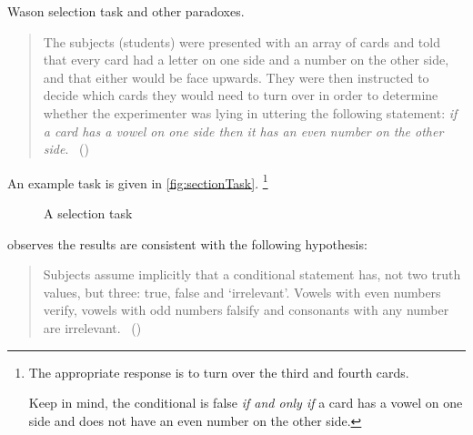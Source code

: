 \begin{note}
  Wason selection task and other paradoxes.

  \begin{quote}
    The subjects (students) were presented with an array of cards and told that every card had a letter on one side and a number on the other side, and that either would be face upwards.
    They were then instructed to decide which cards they would need to turn over in order to determine whether the experimenter was lying in uttering the following statement:
    \emph{if a card has a vowel on one side then it has an even number on the other side}.%
    \mbox{ }\hfill\mbox{(\citeyear[145--146]{Wason:1966aa})}
  \end{quote}

  An example task is given in \autoref{fig:sectionTask}.%
  \footnote{
    The appropriate response is to turn over the third and fourth cards.

    Keep in mind, the conditional is false \emph{if and only if} a card has a vowel on one side and does not have an even number on the other side.
  }

  \begin{figure}[H]
    \centering
    \caption{A selection task}
    \label{fig:sectionTask}
  \end{figure}

  \citeauthor{Wason:1966aa} observes the results are consistent with the following hypothesis:
  \begin{quote}
    Subjects assume implicitly that a conditional statement has, not two truth values, but three: true, false and `irrelevant'.
    Vowels with even numbers verify, vowels with odd numbers falsify and consonants with any number are irrelevant.%
    \mbox{ }\hfill\mbox{(\citeyear[146]{Wason:1966aa})}
  \end{quote}


\end{note}
